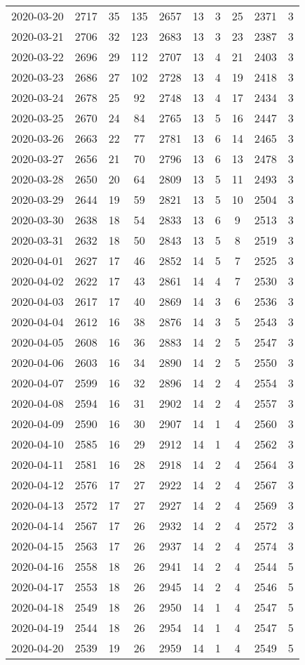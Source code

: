 \begin{longtable}{cccccccccc}
2020-03-20&2717&35&135&2657&13&3&25&2371&3\\
2020-03-21&2706&32&123&2683&13&3&23&2387&3\\
2020-03-22&2696&29&112&2707&13&4&21&2403&3\\
2020-03-23&2686&27&102&2728&13&4&19&2418&3\\
2020-03-24&2678&25&92&2748&13&4&17&2434&3\\
2020-03-25&2670&24&84&2765&13&5&16&2447&3\\
2020-03-26&2663&22&77&2781&13&6&14&2465&3\\
2020-03-27&2656&21&70&2796&13&6&13&2478&3\\
2020-03-28&2650&20&64&2809&13&5&11&2493&3\\
2020-03-29&2644&19&59&2821&13&5&10&2504&3\\
2020-03-30&2638&18&54&2833&13&6&9&2513&3\\
2020-03-31&2632&18&50&2843&13&5&8&2519&3\\
2020-04-01&2627&17&46&2852&14&5&7&2525&3\\
2020-04-02&2622&17&43&2861&14&4&7&2530&3\\
2020-04-03&2617&17&40&2869&14&3&6&2536&3\\
2020-04-04&2612&16&38&2876&14&3&5&2543&3\\
2020-04-05&2608&16&36&2883&14&2&5&2547&3\\
2020-04-06&2603&16&34&2890&14&2&5&2550&3\\
2020-04-07&2599&16&32&2896&14&2&4&2554&3\\
2020-04-08&2594&16&31&2902&14&2&4&2557&3\\
2020-04-09&2590&16&30&2907&14&1&4&2560&3\\
2020-04-10&2585&16&29&2912&14&1&4&2562&3\\
2020-04-11&2581&16&28&2918&14&2&4&2564&3\\
2020-04-12&2576&17&27&2922&14&2&4&2567&3\\
2020-04-13&2572&17&27&2927&14&2&4&2569&3\\
2020-04-14&2567&17&26&2932&14&2&4&2572&3\\
2020-04-15&2563&17&26&2937&14&2&4&2574&3\\
2020-04-16&2558&18&26&2941&14&2&4&2544&5\\
2020-04-17&2553&18&26&2945&14&2&4&2546&5\\
2020-04-18&2549&18&26&2950&14&1&4&2547&5\\
2020-04-19&2544&18&26&2954&14&1&4&2547&5\\
2020-04-20&2539&19&26&2959&14&1&4&2549&5\\

\end{longtable}
